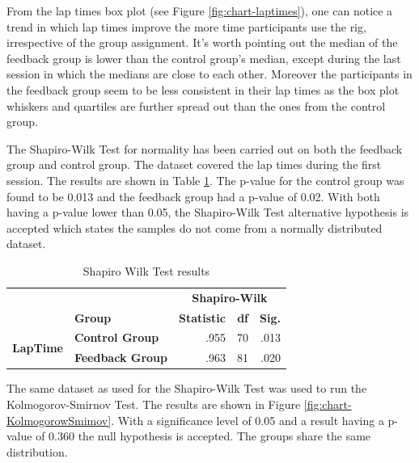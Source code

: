 From the lap times box plot (see Figure \ref{fig:chart-laptimes}), one can notice a trend in which lap times improve the more time participants use the rig, irrespective of the group assignment. It's worth pointing out the median of the feedback group is lower than the control group's median, except during the last session in which the medians are close to each other. Moreover the participants in the feedback group seem to be less consistent in their lap times as the box plot whiskers and quartiles are further spread out than the ones from the control group.

The Shapiro-Wilk Test for normality has been carried out on both the feedback group and control group. The dataset covered the lap times during the first session. The results are shown in Table \ref{table:shapiroWilk}. The p-value for the control group was found to be 0.013 and the feedback group had a p-value of 0.02. With both having a p-value lower than 0.05, the Shapiro-Wilk Test alternative hypothesis is accepted which states the samples do not come from a normally distributed dataset.

\begin{table}[]
	\centering
	\begin{tabular}{ll|rrr|}
		\cline{3-5}
		&                         & \multicolumn{3}{c|}{\textbf{Shapiro-Wilk}}                          \\ \cline{2-2}
		\multicolumn{1}{l|}{\textbf{}}                          & \textbf{Group}          & \textbf{Statistic}        & \textbf{df}             & \textbf{Sig.} \\ \hline
		\multicolumn{1}{|c|}{\multirow{2}{*}{\textbf{LapTime}}} & \textbf{Control Group}  & \multicolumn{1}{r|}{.955} & \multicolumn{1}{r|}{70} & .013          \\ \cline{2-5} 
		\multicolumn{1}{|c|}{}                                  & \textbf{Feedback Group} & \multicolumn{1}{r|}{.963} & \multicolumn{1}{r|}{81} & .020          \\ \hline
	\end{tabular}
	\caption[Shapiro Wilk Test results]{Shapiro Wilk Test results}
	\label{table:shapiroWilk}
\end{table}

The same dataset as used for the Shapiro-Wilk Test was used to run the Kolmogorov-Smirnov Test. The results are shown in Figure \ref{fig:chart-KolmogorowSmimov}. With a significance level of 0.05 and a result having a p-value of 0.360 the null hypothesis is accepted. The groups share the same distribution.

